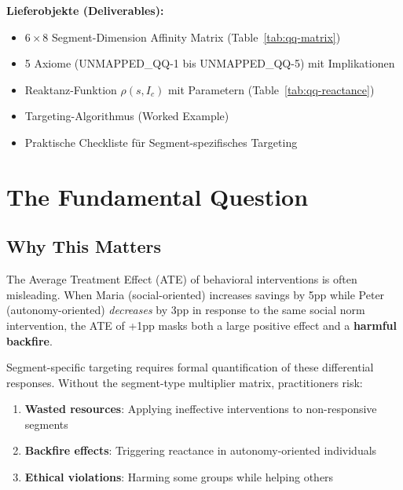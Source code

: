 \begin{tcolorbox}[
    colback=orange!5!white,
    colframe=orange!75!black,
    title={\textbf{Appendix Scope: Ziel / In-Scope / Out-of-Scope / Constraints}},
    fonttitle=\bfseries
]
\textbf{Lieferobjekte (Deliverables):}
\begin{itemize}[nosep]
    \item $6 \times 8$ Segment-Dimension Affinity Matrix (Table~\ref{tab:qq-matrix})
    \item 5 Axiome (UNMAPPED_QQ-1 bis UNMAPPED_QQ-5) mit Implikationen
    \item Reaktanz-Funktion $\rho(s, I_c)$ mit Parametern (Table~\ref{tab:qq-reactance})
    \item Targeting-Algorithmus (Worked Example)
    \item Praktische Checkliste für Segment-spezifisches Targeting
\end{itemize}

\end{tcolorbox}



\section{The Fundamental Question}
\label{sec:qq-fundamental}

\subsection{Why This Matters}

The Average Treatment Effect (ATE) of behavioral interventions is often misleading.
When Maria (social-oriented) increases savings by 5pp while Peter (autonomy-oriented)
\textit{decreases} by 3pp in response to the same social norm intervention, the
ATE of +1pp masks both a large positive effect and a \textbf{harmful backfire}.

Segment-specific targeting requires formal quantification of these differential
responses. Without the segment-type multiplier matrix, practitioners risk:
\begin{enumerate}
\item \textbf{Wasted resources}: Applying ineffective interventions to non-responsive segments
\item \textbf{Backfire effects}: Triggering reactance in autonomy-oriented individuals
\item \textbf{Ethical violations}: Harming some groups while helping others
\end{enumerate}

